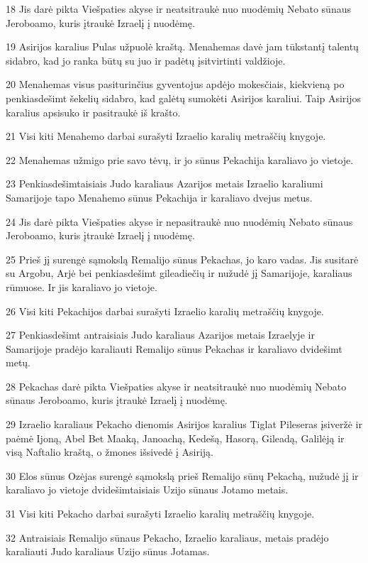 \par 18 Jis darė pikta Viešpaties akyse ir neatsitraukė nuo nuodėmių Nebato sūnaus Jeroboamo, kuris įtraukė Izraelį į nuodėmę. 
\par 19 Asirijos karalius Pulas užpuolė kraštą. Menahemas davė jam tūkstantį talentų sidabro, kad jo ranka būtų su juo ir padėtų įsitvirtinti valdžioje. 
\par 20 Menahemas visus pasiturinčius gyventojus apdėjo mokesčiais, kiekvieną po penkiasdešimt šekelių sidabro, kad galėtų sumokėti Asirijos karaliui. Taip Asirijos karalius apsisuko ir pasitraukė iš krašto. 
\par 21 Visi kiti Menahemo darbai surašyti Izraelio karalių metraščių knygoje. 
\par 22 Menahemas užmigo prie savo tėvų, ir jo sūnus Pekachija karaliavo jo vietoje. 
\par 23 Penkiasdešimtaisiais Judo karaliaus Azarijos metais Izraelio karaliumi Samarijoje tapo Menahemo sūnus Pekachija ir karaliavo dvejus metus. 
\par 24 Jis darė pikta Viešpaties akyse ir nepasitraukė nuo nuodėmių Nebato sūnaus Jeroboamo, kuris įtraukė Izraelį į nuodėmę. 
\par 25 Prieš jį surengė sąmokslą Remalijo sūnus Pekachas, jo karo vadas. Jis susitarė su Argobu, Arjė bei penkiasdešimt gileadiečių ir nužudė jį Samarijoje, karaliaus rūmuose. Ir jis karaliavo jo vietoje. 
\par 26 Visi kiti Pekachijos darbai surašyti Izraelio karalių metraščių knygoje. 
\par 27 Penkiasdešimt antraisiais Judo karaliaus Azarijos metais Izraelyje ir Samarijoje pradėjo karaliauti Remalijo sūnus Pekachas ir karaliavo dvidešimt metų. 
\par 28 Pekachas darė pikta Viešpaties akyse ir neatsitraukė nuo nuodėmių Nebato sūnaus Jeroboamo, kuris įtraukė Izraelį į nuodėmę. 
\par 29 Izraelio karaliaus Pekacho dienomis Asirijos karalius Tiglat Pileseras įsiveržė ir paėmė Ijoną, Abel Bet Maaką, Janoachą, Kedešą, Hasorą, Gileadą, Galilėją ir visą Naftalio kraštą, o žmones išsivedė į Asiriją. 
\par 30 Elos sūnus Ozėjas surengė sąmokslą prieš Remalijo sūnų Pekachą, nužudė jį ir karaliavo jo vietoje dvidešimtaisiais Uzijo sūnaus Jotamo metais. 
\par 31 Visi kiti Pekacho darbai surašyti Izraelio karalių metraščių knygoje. 
\par 32 Antraisiais Remalijo sūnaus Pekacho, Izraelio karaliaus, metais pradėjo karaliauti Judo karaliaus Uzijo sūnus Jotamas. 
